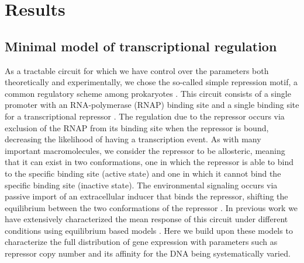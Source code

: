 \section{Results}

\subsection{Minimal model of transcriptional regulation}\label{sec_model}

As a tractable circuit for which we have control over the parameters both
theoretically and experimentally, we chose the so-called simple repression
motif, a common regulatory scheme among prokaryotes \cite{Rydenfelt2014}. This
circuit consists of a single promoter with an RNA-polymerase (RNAP) binding
site and a single binding site for a transcriptional repressor
\cite{Garcia2011c}. The regulation due to the repressor occurs via exclusion of
the RNAP from its binding site when the repressor is bound, decreasing the
likelihood of having a transcription event. As with many important
macromolecules, we consider the repressor to be allosteric, meaning that it can
exist in two conformations, one in which the repressor is able to bind to the
specific binding site (active state) and one in which it cannot bind the
specific binding site (inactive state). The environmental signaling occurs via
passive import of an extracellular inducer that binds the repressor, shifting
the equilibrium between the two conformations of the repressor
\cite{Razo-Mejia2018}. In previous work we have extensively characterized the
mean response of this circuit under different conditions using equilibrium
based models \cite{Phillips2019}. Here we build upon these models to
characterize the full distribution of gene expression with parameters such as
repressor copy number and its affinity for the DNA being systematically varied.

